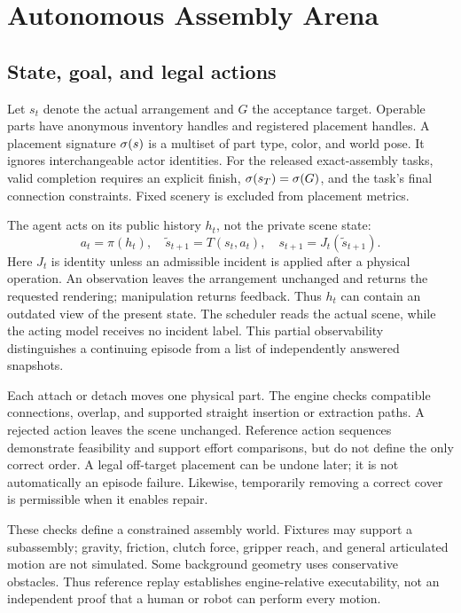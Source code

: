 \documentclass[10pt,twocolumn,letterpaper]{article}
\begin{document}
\section{Autonomous Assembly Arena}
\subsection{State, goal, and legal actions}
Let $s_t$ denote the actual arrangement and $G$ the acceptance target. Operable parts have anonymous inventory handles and registered placement handles. A placement signature $\sigma(s)$ is a multiset of part type, color, and world pose. It ignores interchangeable actor identities. For the released exact-assembly tasks, valid completion requires an explicit finish, $\sigma(s_T)=\sigma(G)$, and the task's final connection constraints. Fixed scenery is excluded from placement metrics.

The agent acts on its public history $h_t$, not the private scene state:
\begin{equation}
 a_t=\pi(h_t),\quad \widetilde{s}_{t+1}=T(s_t,a_t),\quad
 s_{t+1}=J_t(\widetilde{s}_{t+1}).
\end{equation}
Here $J_t$ is identity unless an admissible incident is applied after a physical operation. An observation leaves the arrangement unchanged and returns the requested rendering; manipulation returns feedback. Thus $h_t$ can contain an outdated view of the present state. The scheduler reads the actual scene, while the acting model receives no incident label. This partial observability distinguishes a continuing episode from a list of independently answered snapshots.

Each attach or detach moves one physical part. The engine checks compatible connections, overlap, and supported straight insertion or extraction paths. A rejected action leaves the scene unchanged. Reference action sequences demonstrate feasibility and support effort comparisons, but do not define the only correct order. A legal off-target placement can be undone later; it is not automatically an episode failure. Likewise, temporarily removing a correct cover is permissible when it enables repair.

These checks define a constrained assembly world. Fixtures may support a subassembly; gravity, friction, clutch force, gripper reach, and general articulated motion are not simulated. Some background geometry uses conservative obstacles. Thus reference replay establishes engine-relative executability, not an independent proof that a human or robot can perform every motion.
\end{document}
